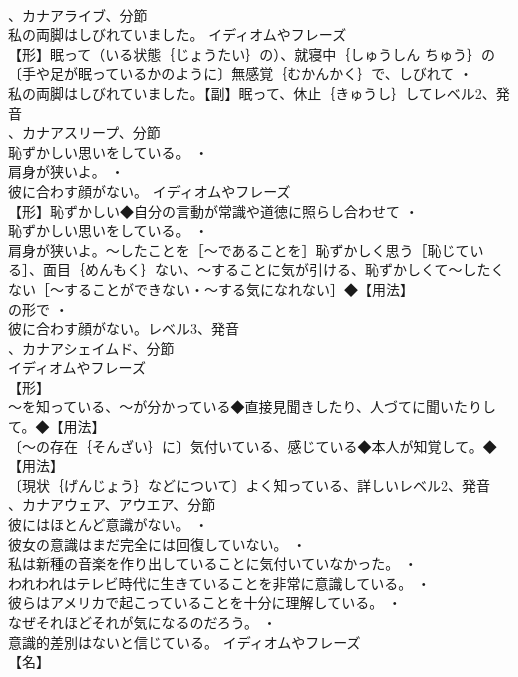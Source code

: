 \documentclass[8pt]{extreport}
\begin{document}
\begin{CJK}{UTF8}{min}
\\	、カナアライブ、分節
\\	私の両脚はしびれていました。	イディオムやフレーズ 
\\	【形】眠って（いる状態｛じょうたい｝の）、就寝中｛しゅうしん ちゅう｝の〔手や足が眠っているかのように〕無感覚｛むかんかく｝で、しびれて ・
\\	私の両脚はしびれていました。【副】眠って、休止｛きゅうし｝してレベル2、発音
\\	、カナアスリープ、分節
\\	恥ずかしい思いをしている。 ・
\\	肩身が狭いよ。 ・
\\	彼に合わす顔がない。	イディオムやフレーズ 
\\	【形】恥ずかしい◆自分の言動が常識や道徳に照らし合わせて ・
\\	恥ずかしい思いをしている。 ・
\\	肩身が狭いよ。～したことを［～であることを］恥ずかしく思う［恥じている］、面目｛めんもく｝ない、～することに気が引ける、恥ずかしくて～したくない［～することができない・～する気になれない］◆【用法】
\\	の形で ・
\\	彼に合わす顔がない。レベル3、発音
\\	、カナアシェイムド、分節
\\	イディオムやフレーズ 
\\	【形】
\\	～を知っている、～が分かっている◆直接見聞きしたり、人づてに聞いたりして。◆【用法】
\\	〔～の存在｛そんざい｝に〕気付いている、感じている◆本人が知覚して。◆【用法】
\\	〔現状｛げんじょう｝などについて〕よく知っている、詳しいレベル2、発音
\\	、カナアウェア、アウエア、分節
\\	彼にはほとんど意識がない。 ・
\\	彼女の意識はまだ完全には回復していない。 ・
\\	私は新種の音楽を作り出していることに気付いていなかった。 ・
\\	われわれはテレビ時代に生きていることを非常に意識している。 ・
\\	彼らはアメリカで起こっていることを十分に理解している。 ・
\\	なぜそれほどそれが気になるのだろう。 ・
\\	意識的差別はないと信じている。	イディオムやフレーズ 
\\	【名】

\end{CJK}
\end{document}
